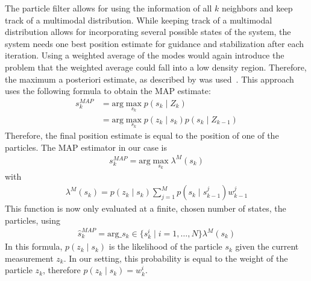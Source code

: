The particle filter allows for using the information of all $k$
neighbors and keep track of a multimodal distribution. While keeping
track of a multimodal distribution allows for incorporating several
possible states of the system, the system needs one best position
estimate for guidance and stabilization after each iteration. Using a
weighted average of the modes would again introduce the problem that
the weighted average could fall into a low density region. Therefore,
the maximum a posteriori estimate, as described by
\citeauthor{driessen2008map} was used~\cite{driessen2008map}. This
approach uses the following formula to obtain the MAP estimate:
\begin{align}
  s_k^{MAP}  &= \text{arg}\max_{s_k}{p(s_k \mid Z_k)}\\
             &= \text{arg}\max_{s_k}{p(z_k \mid s_k) p(s_k \mid Z_{k-1})} 
\end{align}
Therefore, the final position estimate is equal to the position of one
of the particles. The MAP estimator in our case is
\begin{align}
s_k^{MAP} = \text{arg}\max_{s_k} \lambda^M(s_k)
\end{align}
with
\begin{align}
\lambda^M(s_k) = p(z_k \mid s_k) \sum_{j=1}^Mp(s_k \mid s_{k-1}^j)w^j_{k-1}
\end{align}
This function is now only evaluated at a finite, chosen number of
states, the particles, using
\begin{align}
\hat{s}_k^{MAP} = \text{arg}\_{s_k \in \{s_k^i \mid i=1,\ldots,N\}} \lambda^M(s_k)
\end{align}
In this formula, $p(z_k \mid s_k)$ is the likelihood of the particle
$s_k$ given the current measurement $z_k$. In our setting, this
probability is equal to the weight of the particle $z_k$, therefore
$p(z_k \mid s_k) = w^i_k$.

